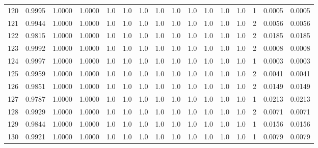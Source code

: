 \begin{tabular}{lrrrrrrrrrrrrrrr}
120 &      0.9995 &  1.0000 &  1.0000 &     1.0 &     1.0 &     1.0 &     1.0 &     1.0 &     1.0 &     1.0 &      1.0 &        1.0 &      1 &                    0.0005 &                     0.0005 \\
121 &      0.9944 &  1.0000 &  1.0000 &     1.0 &     1.0 &     1.0 &     1.0 &     1.0 &     1.0 &     1.0 &      1.0 &        1.0 &      2 &                    0.0056 &                     0.0056 \\
122 &      0.9815 &  1.0000 &  1.0000 &     1.0 &     1.0 &     1.0 &     1.0 &     1.0 &     1.0 &     1.0 &      1.0 &        1.0 &      2 &                    0.0185 &                     0.0185 \\
123 &      0.9992 &  1.0000 &  1.0000 &     1.0 &     1.0 &     1.0 &     1.0 &     1.0 &     1.0 &     1.0 &      1.0 &        1.0 &      2 &                    0.0008 &                     0.0008 \\
124 &      0.9997 &  1.0000 &  1.0000 &     1.0 &     1.0 &     1.0 &     1.0 &     1.0 &     1.0 &     1.0 &      1.0 &        1.0 &      1 &                    0.0003 &                     0.0003 \\
125 &      0.9959 &  1.0000 &  1.0000 &     1.0 &     1.0 &     1.0 &     1.0 &     1.0 &     1.0 &     1.0 &      1.0 &        1.0 &      2 &                    0.0041 &                     0.0041 \\
126 &      0.9851 &  1.0000 &  1.0000 &     1.0 &     1.0 &     1.0 &     1.0 &     1.0 &     1.0 &     1.0 &      1.0 &        1.0 &      2 &                    0.0149 &                     0.0149 \\
127 &      0.9787 &  1.0000 &  1.0000 &     1.0 &     1.0 &     1.0 &     1.0 &     1.0 &     1.0 &     1.0 &      1.0 &        1.0 &      1 &                    0.0213 &                     0.0213 \\
128 &      0.9929 &  1.0000 &  1.0000 &     1.0 &     1.0 &     1.0 &     1.0 &     1.0 &     1.0 &     1.0 &      1.0 &        1.0 &      2 &                    0.0071 &                     0.0071 \\
129 &      0.9844 &  1.0000 &  1.0000 &     1.0 &     1.0 &     1.0 &     1.0 &     1.0 &     1.0 &     1.0 &      1.0 &        1.0 &      1 &                    0.0156 &                     0.0156 \\
130 &      0.9921 &  1.0000 &  1.0000 &     1.0 &     1.0 &     1.0 &     1.0 &     1.0 &     1.0 &     1.0 &      1.0 &        1.0 &      1 &                    0.0079 &                     0.0079 \\

\end{tabular}
